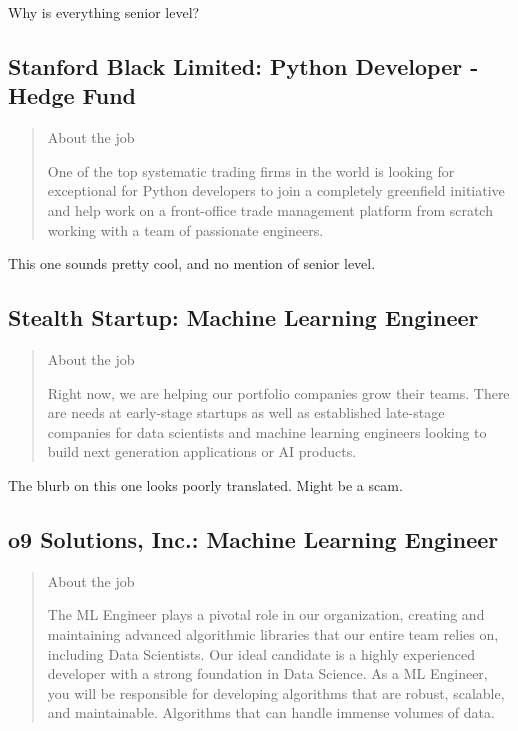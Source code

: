 \documentclass[
	letterpaper, %
	12pt, %
]{CSSullivanBusinessReport}
\begin{document}
Why is everything senior level?


\subsection[Stanford Black Limited]{Stanford Black Limited: Python Developer - Hedge Fund}

\begin{quote}
	About the job
	
	One of the top systematic trading firms in the world is looking for exceptional for Python developers to join a completely greenfield initiative and help work on a front-office trade management platform from scratch working with a team of passionate engineers.

\end{quote}

This one sounds pretty cool, and no mention of senior level. 


\subsection[Stealth Startup]{Stealth Startup: Machine Learning Engineer}

\begin{quote}
	About the job
	
	Right now, we are helping our portfolio companies grow their teams. There are needs at early-stage startups as well as established late-stage companies for data scientists and machine learning engineers looking to build next generation applications or AI products.

\end{quote}

The blurb on this one looks poorly translated. Might be a scam. 


\subsection[o9 Solutions, Inc.]{o9 Solutions, Inc.: Machine Learning Engineer}

\begin{quote}
	About the job
	
	The ML Engineer plays a pivotal role in our organization, creating and maintaining advanced algorithmic libraries that our entire team relies on, including Data Scientists. Our ideal candidate is a highly experienced developer with a strong foundation in Data Science. As a ML Engineer, you will be responsible for developing algorithms that are robust, scalable, and maintainable. Algorithms that can handle immense volumes of data.

\end{quote}
\end{document}
